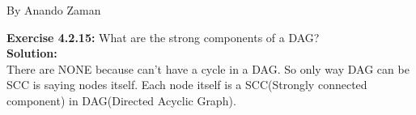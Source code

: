 \documentclass[11pt,fleqn]{article}
\begin{document}
By Anando Zaman

\textbf{Exercise 4.2.15:} What are the strong components of a DAG?\\

\textbf{Solution:}\\
There are NONE because can't have a cycle in a DAG. So only way DAG can be SCC is saying nodes itself. Each node itself is a SCC(Strongly connected component) in DAG(Directed Acyclic Graph).

	
\end{document}

